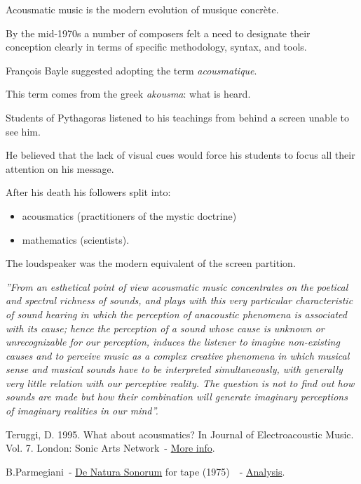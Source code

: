 Acousmatic music is the modern evolution of musique concrète.

By the mid-1970s a number of composers felt a need to designate their conception clearly in terms of specific methodology, syntax, and tools.

François Bayle suggested adopting the term \textit{acousmatique}.

This term comes from the greek \textit{akousma}: what is heard.

Students of Pythagoras listened to his teachings from behind a screen unable to see him.

He believed that the lack of visual cues would force his students to focus all their attention on his message.

After his death his followers split into:

\begin{itemize}
\tightlist\item acousmatics (practitioners of the mystic doctrine)
\item mathematics (scientists).
\end{itemize}

The loudspeaker was the modern equivalent of the screen partition.

\textit{''From an esthetical point of view acousmatic music concentrates on the poetical and spectral richness of sounds, and plays with this very particular characteristic of sound hearing in which the perception of anacoustic phenomena is associated with its cause; hence the perception of a sound whose cause is unknown or unrecognizable for our perception, induces the listener to imagine non-existing causes and to perceive
music as a complex creative phenomena in which musical sense and musical sounds have to be interpreted simultaneously, with generally very little relation with our perceptive reality. The question is not to find out how sounds are made but how their combination will generate imaginary perceptions of imaginary realities in our mind''.}

Teruggi, D. 1995. What about acousmatics? In Journal of Electroacoustic
Music. Vol. 7. London: Sonic Arts Network~- \href{http://www.musicaecodice.it/on_server/media/2_media/teruggi.pdf}{More info}.

B.Parmegiani~- \href{http://www.musicaecodice.it/on_server/media/2_media/parmegiani.mp3}{De Natura Sonorum} for tape (1975)~\cite{natura}~- \href{http://www.musicaecodice.it/on_server/media/2_media/parmegiani.pdf}{Analysis}.

